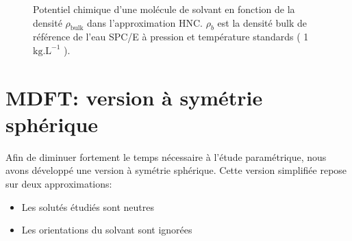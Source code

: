 


\begin{figure}[h]
    \center
    \caption[Potentiel chimique d'une molécule de solvant en fonction de sa densité.]{Potentiel chimique d'une molécule de solvant en fonction de la densité $\rho_{\mathrm{bulk}}$ dans l'approximation HNC. $\rho_b$ est la densité bulk de référence de l'eau SPC/E à pression et température standards ( 1 $\mathrm{kg.L}^{-1}$ ).}
    \label{fig:fonctionelle_HNC}
\end{figure}





\section{MDFT: version à symétrie sphérique}
Afin de diminuer fortement le temps nécessaire à l'étude paramétrique, nous avons développé une version à symétrie sphérique. Cette version simplifiée repose sur deux approximations:
\begin{itemize}
\item Les solutés étudiés sont neutres
\item Les orientations du solvant sont ignorées
\end{itemize}

